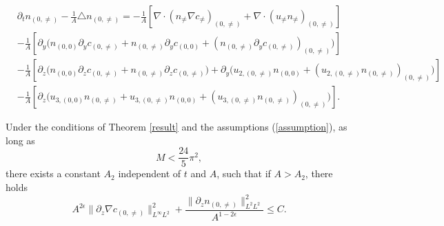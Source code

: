 \documentclass[10pt,a4paper]{amsart}
\begin{document}
	\begin{equation}\label{n_0_neq}
		\begin{aligned}
			&\partial_t n_{(0,\neq)}-\frac{1}{A}\triangle n_{(0,\neq)}
			=-\frac{1}{A}\left[\nabla\cdot(n_{\neq}\nabla c_{\neq})_{(0,\neq)}
			+\nabla\cdot(u_{\neq}n_{\neq})_{(0,\neq)}\right]\\
			&-\frac{1}{A}\left[\partial_y\big(n_{(0,0)}\partial_{y}c_{(0,\neq)}
			+n_{(0,\neq)}\partial_{y}c_{(0,0)}
			+(n_{(0,\neq)}\partial_{y}c_{(0,\neq)})_{(0,\neq)}\big)\right]\\
			&-\frac{1}{A}\left[\partial_z\big(n_{(0,0)}\partial_{z}c_{(0,\neq)}  
			+n_{(0,\neq)}\partial_{z}c_{(0,\neq)}\big)
			+\partial_y\big(u_{2,(0,\neq)}n_{(0,0)}
			+(u_{2,(0,\neq)}n_{(0,\neq)})_{(0,\neq)}\big)\right]\\
			&-\frac{1}{A}\left[\partial_z\big(u_{3,(0,0)}n_{(0,\neq)}
			+u_{3,(0,\neq)}n_{(0,0)}
			+(u_{3,(0,\neq)}n_{(0,\neq)})_{(0,\neq)}\big)\right].
		\end{aligned}
	\end{equation}

	\begin{lemma}\label{lemma_n002}
		Under the conditions of Theorem \ref{result} and the assumptions (\ref{assumption}), 
		as long as $$M< \frac{24}{5}\pi^2,$$
		there exists a constant $A_2$ independent of $t$ and $A$, such that if $A>A_2$, 
		there holds 
		$$
		A^{2\epsilon}\|\partial_z\nabla c_{(0,\neq)}\|^2_{L^{\infty}L^2}+
		\frac{\|\partial_zn_{(0,\neq)}\|^2_{L^2L^2}}{A^{1-2\epsilon}}\leq C.$$
	\end{lemma}
\end{document}

